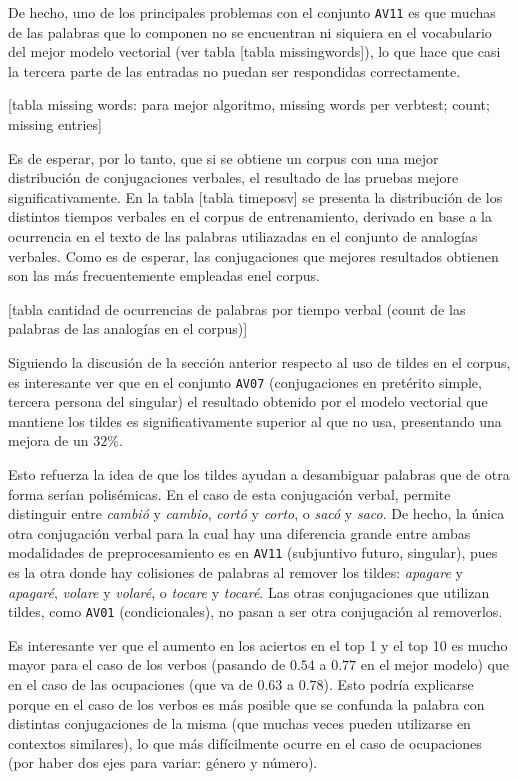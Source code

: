 De hecho, uno de los principales problemas con el conjunto \texttt{AV11} es que muchas de las
palabras que lo componen no se encuentran ni siquiera en el vocabulario del mejor modelo vectorial
(ver tabla [tabla missingwords]), lo que hace que casi la tercera parte de las entradas no puedan
ser respondidas correctamente.

[tabla missing words: para mejor algoritmo, missing words per verbtest; count; missing entries]

Es de esperar, por lo tanto, que si se obtiene un corpus con una mejor distribución de conjugaciones
verbales, el resultado de las pruebas mejore significativamente. En la tabla [tabla timeposv] se
presenta la distribución de los distintos tiempos verbales en el corpus de entrenamiento, derivado
en base a la ocurrencia en el texto de las palabras utiliazadas en el conjunto de analogías
verbales. Como es de esperar, las conjugaciones que mejores resultados obtienen son las más
frecuentemente empleadas enel corpus.

[tabla cantidad de ocurrencias de palabras por tiempo verbal (count de las palabras de las analogías
en el corpus)]

Siguiendo la discusión de la sección anterior respecto al uso de tildes en el corpus, es interesante
ver que en el conjunto \texttt{AV07} (conjugaciones en pretérito simple, tercera persona del
singular) el resultado obtenido por el modelo vectorial que mantiene los tildes es
significativamente superior al que no usa, presentando una mejora de un $32\%$.

Esto refuerza la idea de que los tildes ayudan a desambiguar palabras que de otra forma serían
polisémicas. En el caso de esta conjugación verbal, permite distinguir entre \textit{cambió} y
\textit{cambio}, \textit{cortó} y \textit{corto}, o \textit{sacó} y \textit{saco}. De hecho, la
única otra conjugación verbal para la cual hay una diferencia grande entre ambas modalidades de
preprocesamiento es en \texttt{AV11} (subjuntivo futuro, singular), pues es la otra donde hay
colisiones de palabras al remover los tildes: \textit{apagare} y \textit{apagaré}, \textit{volare} y
\textit{volaré}, o \textit{tocare} y \textit{tocaré}. Las otras conjugaciones que utilizan tildes,
como \texttt{AV01} (condicionales), no pasan a ser otra conjugación al removerlos.

Es interesante ver que el aumento en los aciertos en el top 1 y el top 10 es mucho mayor para el
caso de los verbos (pasando de $0.54$ a $0.77$ en el mejor modelo) que en el caso de las ocupaciones
(que va de $0.63$ a $0.78$). Esto podría explicarse porque en el caso de los verbos es más posible
que se confunda la palabra con distintas conjugaciones de la misma (que muchas veces pueden
utilizarse en contextos similares), lo que más difícilmente ocurre en el caso de ocupaciones (por
haber dos ejes para variar: género y número).



